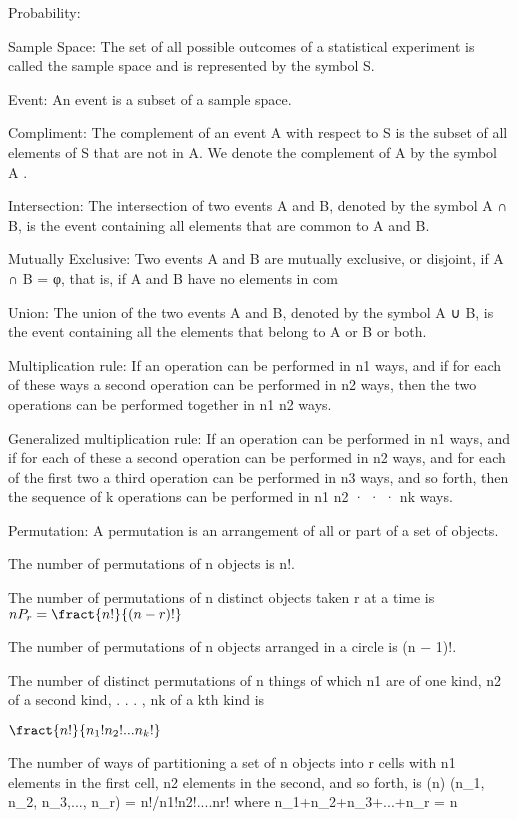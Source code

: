 Probability:

Sample Space:
The set of all possible outcomes of a statistical experiment is called the sample
space and is represented by the symbol S.

Event:
An event is a subset of a sample space.

Compliment:
The complement of an event A with respect to S is the subset of all elements
of S that are not in A. We denote the complement of A by the symbol A .

Intersection:
The intersection of two events A and B, denoted by the symbol A ∩ B, is the
event containing all elements that are common to A and B.

Mutually Exclusive:
Two events A and B are mutually exclusive, or disjoint, if A ∩ B = φ, that
is, if A and B have no elements in com

Union:
The union of the two events A and B, denoted by the symbol A ∪ B, is the event
containing all the elements that belong to A or B or both.

Multiplication rule:
 If an operation can be performed in n1 ways, and if for each of these ways a second
operation can be performed in n2 ways, then the two operations can be performed
together in n1 n2 ways.

Generalized multiplication rule:
 If an operation can be performed in n1 ways, and if for each of these a second
operation can be performed in n2 ways, and for each of the first two a third
operation can be performed in n3 ways, and so forth, then the sequence of k
operations can be performed in n1 n2 · · · nk ways.

Permutation:
A permutation is an arrangement of all or part of a set of objects.

The number of permutations of n objects is n!.

The number of permutations of n distinct objects taken r at a time is
$nP_r = \fract{n!}{(n-r)!}$

The number of permutations of n objects arranged in a circle is (n − 1)!.

The number of distinct permutations of n things of which n1 are of one kind, n2
of a second kind, . . . , nk of a kth kind is

$\fract{n!}{n_1!n_2!...n_k!}$


The number of ways of partitioning a set of n objects into r cells with n1 elements
in the first cell, n2 elements in the second, and so forth, is
(n)
(n_1, n_2, n_3,..., n_r) = n!/n1!n2!....nr!
where n_1+n_2+n_3+...+n_r = n

